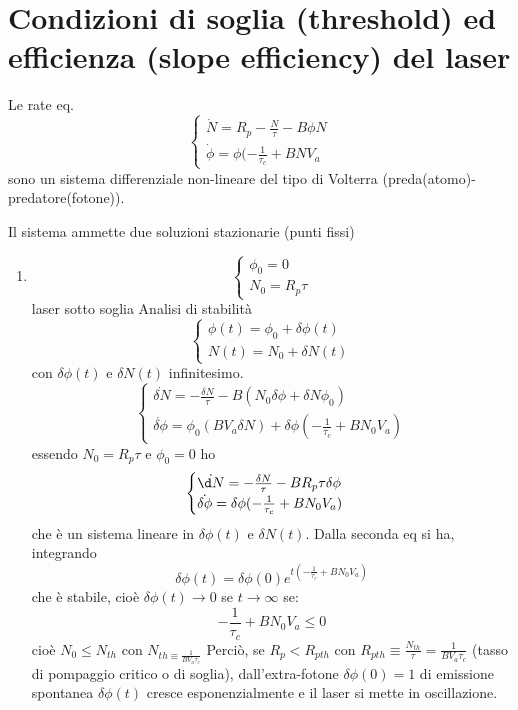 \documentclass{book}
\theoremstyle{remark}
\begin{document}
\section*{Condizioni di soglia (threshold) ed efficienza (slope efficiency) del laser}
Le rate eq.
\begin{equation*}
\begin{cases}
\dot{N} = R_p - \frac{N}{\tau} - B\phi N\\
\dot{\phi} = \phi(-\frac{1}{\tau_c} + BN V_a
\end{cases}
\end{equation*}
sono un sistema differenziale non-lineare del tipo di Volterra (preda(atomo)-predatore(fotone)).

Il sistema ammette due soluzioni stazionarie (punti fissi)
\begin{enumerate}
\item \begin{equation*}
\begin{cases}
\phi_0 = 0\\
N_0 = R_p \tau
\end{cases}
\end{equation*}laser sotto soglia
Analisi di stabilità
\begin{equation*}
\begin{cases}
\phi(t) = \phi_0 + \delta \phi(t)\\
N(t) = N_0 + \delta N(t)
\end{cases}
\end{equation*}
con $\delta \phi(t)$ e $\delta N(t)$ infinitesimo.
\begin{equation*}
\begin{cases}
\dot{\delta N} = -\frac{\delta N}{\tau} - B(N_0 \delta \phi + \delta N \phi_0)\\
\dot{\delta \phi} = \phi_0(BV_a \delta N) + \delta\phi(-\frac{1}{\tau_c} + BN_0V_a)
\end{cases}
\end{equation*}
essendo $N_0 = R_p\tau$ e $\phi_0 = 0$ ho
\begin{equation*}
\begin{cases}
\dot{\d N} = -\frac{\delta N}{\tau} - B R_p \tau \delta \phi\\
\dot{\delta \phi} = \delta\phi(-\frac{1}{\tau_c} + BN_0V_a) 
\end{cases}
\end{equation*}
che è un sistema lineare in $\delta \phi(t)$ e $\delta N(t)$. Dalla seconda eq si ha, integrando
\begin{equation*}
\delta \phi(t) = \delta\phi(0) e^{t(-\frac{1}{\tau_c} + BN_0V_a)}
\end{equation*}
che è stabile, cioè $\delta \phi(t) \rightarrow 0$ se $t \rightarrow \infty$ se:
\begin{equation*}
-\frac{1}{\tau_c} + BN_0V_a \leq 0
\end{equation*}
cioè $ N_0 \leq N_{th}$ con $N_{th \equiv \frac{1}{BV_a \tau_c}}$
Perciò, se $R_p < R_{pth}$ con $R_{pth} \equiv \frac{N_{th}}{\tau} = \frac{1}{BV_a \tau_c}$ (tasso di pompaggio critico o di soglia), dall'extra-fotone $\delta\phi(0) = 1$ di emissione spontanea $\delta\phi(t)$ cresce esponenzialmente e il laser si mette in oscillazione.
\end{enumerate}
\end{document}
